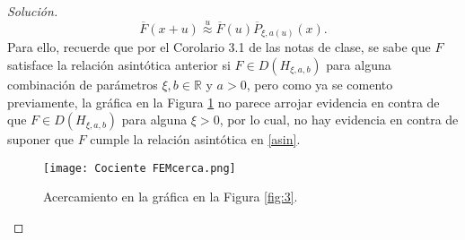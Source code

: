 \documentclass[10.5pt,notitlepage]{article}
\newenvironment{solucion}
  {\begin{proof}[Solución]}
  {\end{proof}}
\newcommand{\RR}{\mathbb{R}}
\newcommand{\approxu}{\overset{u}{\approx}}
\theoremstyle{plain}
\begin{document}
\begin{solucion}
\begin{equation}\label{asin}
    \overline{F}(x + u) \approxu \overline{F}(u)\overline{P}_{\xi,a(u)}(x). 
\end{equation}
Para ello, recuerde que por el Corolario 3.1 de las notas de clase, se sabe que \(F\) satisface la relación asintótica anterior si \(F \in D(H_{\xi, a,b})\) para alguna combinación de parámetros \(\xi,b \in \RR\) y \(a > 0\), pero como ya se comento previamente, la gráfica en la Figura \ref{fig:4} no parece arrojar evidencia en contra de que \(F \in D(H_{\xi,a, b})\) para alguna \(\xi >0\), por lo cual, no hay evidencia en contra de suponer que \(F\) cumple la relación asintótica en \eqref{asin}.   
\begin{figure}[htb]
    \centering
    \texttt{[image: Cociente FEMcerca.png]}
    \caption{Acercamiento en la gráfica en la Figura \ref{fig:3}.}
    \label{fig:4}
\end{figure}



\end{solucion}
\end{document}
